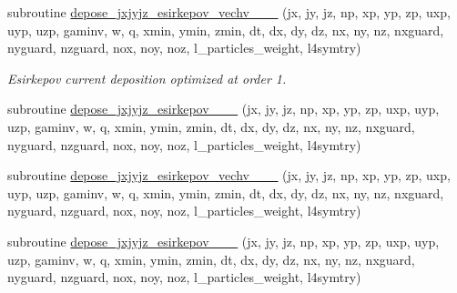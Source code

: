 \begin{DoxyCompactItemize}
\item 
subroutine \hyperlink{current__deposition_8_f90_a29f972e9b6064aee31d065c4f54aa184}{depose\+\_\+jxjyjz\+\_\+esirkepov\+\_\+vechv\+\_\+\_\+\_} (jx, jy, jz, np, xp, yp, zp, uxp, uyp, uzp, gaminv, w, q, xmin, ymin, zmin,                                                                                                                                                   dt, dx, dy, dz, nx, ny, nz, nxguard, nyguard, nzguard,                                                                                                                                                   nox, noy, noz, l\+\_\+particles\+\_\+weight, l4symtry)
\begin{DoxyCompactList}\small\item\em Esirkepov current deposition optimized at order 1. \end{DoxyCompactList}\item 
subroutine \hyperlink{current__deposition_8_f90_a1b0279f68e8d25ed75dea74ec525c04b}{depose\+\_\+jxjyjz\+\_\+esirkepov\+\_\+\_\+\_} (jx, jy, jz, np, xp, yp, zp, uxp, uyp, uzp, gaminv, w, q, xmin, ymin, zmin,                                                                                                                                                   dt, dx, dy, dz, nx, ny, nz, nxguard, nyguard, nzguard,                                                                                                                                                   nox, noy, noz, l\+\_\+particles\+\_\+weight, l4symtry)
\item 
subroutine \hyperlink{current__deposition_8_f90_aa0e11e28c778e0f5357c21b9326ff40d}{depose\+\_\+jxjyjz\+\_\+esirkepov\+\_\+vechv\+\_\+\_\+\_} (jx, jy, jz, np, xp, yp, zp, uxp, uyp, uzp, gaminv, w, q, xmin, ymin, zmin,                                                                                                                                                   dt, dx, dy, dz, nx, ny, nz, nxguard, nyguard, nzguard,                                                                                                                                                   nox, noy, noz, l\+\_\+particles\+\_\+weight, l4symtry)
\item 
subroutine \hyperlink{current__deposition_8_f90_a764fd99e306237a96ae8675235ca96bb}{depose\+\_\+jxjyjz\+\_\+esirkepov\+\_\+\_\+\_} (jx, jy, jz, np, xp, yp, zp, uxp, uyp, uzp, gaminv, w, q, xmin, ymin, zmin,                                                                                                                                                   dt, dx, dy, dz, nx, ny, nz, nxguard, nyguard, nzguard,                                                                                                                                                   nox, noy, noz, l\+\_\+particles\+\_\+weight, l4symtry)

\end{DoxyCompactItemize}
